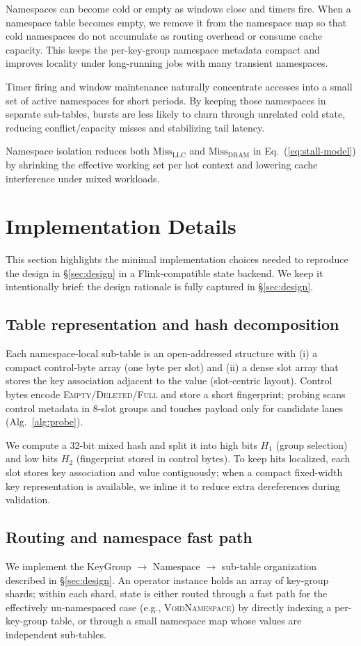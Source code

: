 \documentclass[sigconf]{acmart}
\begin{document}
Namespaces can become cold or empty as windows close and timers fire. When a namespace table becomes empty, we remove it from the namespace map so that cold namespaces do not accumulate as routing overhead or consume cache capacity. This keeps the per-key-group namespace metadata compact and improves locality under long-running jobs with many transient namespaces.

Timer firing and window maintenance naturally concentrate accesses into a small set of active namespaces for short periods. By keeping those namespaces in separate sub-tables, bursts are less likely to churn through unrelated cold state, reducing conflict/capacity misses and stabilizing tail latency.

Namespace isolation reduces both $\mathrm{Miss}_{\mathrm{LLC}}$ and $\mathrm{Miss}_{\mathrm{DRAM}}$ in Eq.~(\ref{eq:stall-model}) by shrinking the effective working set per hot context and lowering cache interference under mixed workloads.

\section{Implementation Details}
This section highlights the minimal implementation choices needed to reproduce the design in \S\ref{sec:design} in a Flink-compatible state backend. We keep it intentionally brief: the design rationale is fully captured in \S\ref{sec:design}.

\subsection{Table representation and hash decomposition}
Each namespace-local sub-table is an open-addressed structure with (i) a compact control-byte array (one byte per slot) and (ii) a dense slot array that stores the key association adjacent to the value (slot-centric layout). Control bytes encode \textsc{Empty}/\textsc{Deleted}/\textsc{Full} and store a short fingerprint; probing scans control metadata in 8-slot groups and touches payload only for candidate lanes (Alg.~\ref{alg:probe}).

We compute a 32-bit mixed hash and split it into high bits $H_1$ (group selection) and low bits $H_2$ (fingerprint stored in control bytes). To keep hits localized, each slot stores key association and value contiguously; when a compact fixed-width key representation is available, we inline it to reduce extra dereferences during validation.

\subsection{Routing and namespace fast path}
We implement the KeyGroup $\rightarrow$ Namespace $\rightarrow$ sub-table organization described in \S\ref{sec:design}. An operator instance holds an array of key-group shards; within each shard, state is either routed through a fast path for the effectively un-namespaced case (e.g., \textsc{VoidNamespace}) by directly indexing a per-key-group table, or through a small namespace map whose values are independent sub-tables.
\end{document}

